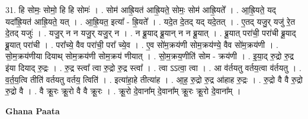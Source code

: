 \documentclass[17pt]{extarticle}
\begin{document}
31. हि सोमः॒ सोमो॒ हि हि सोमः॑ । . सोम॑ आह्रि॒यत॑ आह्रि॒यते॒ सोमः॒ सोम॑ आह्रि॒यते᳚ । . आ॒ह्रि॒यते॒ यद् यदा᳚ह्रि॒यत॑ आह्रि॒यते॒ यत् । . आ॒ह्रि॒यत॒ इत्या᳚ - ह्रि॒यते᳚ । . यदे॒त दे॒तद् यद् यदे॒तत् । . ए॒तद् यजु॒र् यजु॑ रे॒त दे॒तद् यजुः॑ । . यजु॒र् न न यजु॒र् यजु॒र् न । . न ब्रू॒याद् ब्रू॒यान् न न ब्रू॒यात् । . ब्रू॒यात् परा॑ची॒ परा॑ची ब्रू॒याद् ब्रू॒यात् परा॑ची । . परा᳚च्ये॒ वैव परा॑ची॒ परा᳚ च्ये॒व । . ए॒व सो॑म॒क्रय॑णी सोम॒क्रय॑ण्ये॒ वैव सो॑म॒क्रय॑णी । . सो॒म॒क्रय॑णीया दियाथ् सोम॒क्रय॑णी सोम॒क्रय॑ णीयात् । . सो॒म॒क्रय॒णीति॑ सोम - क्रय॑णी । . इ॒या॒द् रु॒द्रो रु॒द्र इ॑या दियाद् रु॒द्रः । . रु॒द्र स्त्वा᳚ त्वा रु॒द्रो रु॒द्र स्त्वा᳚ । . त्वा ऽऽत्वा॒ त्वा । . आ व॑र्तयतु वर्तय॒त्वा व॑र्तयतु । . व॒र्त॒य॒त्वि तीति॑ वर्तयतु वर्तय॒ त्विति॑ । . इत्या॑हा॒हे तीत्या॑ह । . आ॒ह॒ रु॒द्रो रु॒द्र आ॑हाह रु॒द्रः । . रु॒द्रो वै वै रु॒द्रो रु॒द्रो वै । . वै क्रू॒रः क्रू॒रो वै वै क्रू॒रः । . क्रू॒रो दे॒वाना᳚म् दे॒वाना᳚म् क्रू॒रः क्रू॒रो दे॒वाना᳚म् । \newline

\textbf{Ghana Paata } \newline
\end{document}
